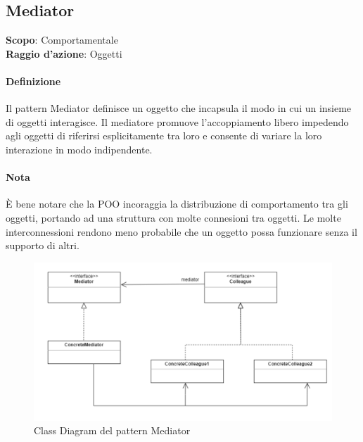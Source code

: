 \subsection{Mediator}
\label{mediator}

\textbf{Scopo}: Comportamentale \\
\textbf{Raggio d'azione}: Oggetti

\paragraph{Definizione} Il pattern Mediator definisce un oggetto che incapsula il modo in cui un insieme di oggetti interagisce. Il mediatore promuove l’accoppiamento libero impedendo agli oggetti di riferirsi esplicitamente tra loro e consente di variare la loro interazione in modo indipendente.

\paragraph{Nota} È bene notare che la POO incoraggia la distribuzione di comportamento tra gli oggetti, portando ad una struttura con molte connesioni tra oggetti. Le molte interconnessioni rendono meno probabile che un oggetto possa funzionare senza il supporto di altri.

\begin{figure}[H]
    \centering
    \includegraphics[width=0.8\linewidth]{assets/pattern/mediator/mediator-struttura.png}
    \caption{Class Diagram del pattern Mediator}
\end{figure}

